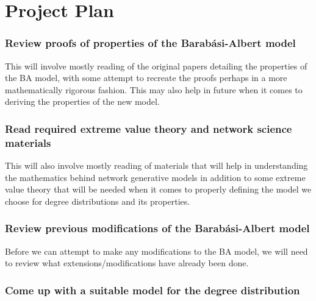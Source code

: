 \documentclass[
]{article}
\begin{document}
\newpage{}

\section{Project Plan}\label{project-plan}

\subsubsection*{Review proofs of properties of the Barabási-Albert
model}\label{review-proofs-of-properties-of-the-barabuxe1si-albert-model}

This will involve mostly reading of the original papers detailing the
properties of the BA model, with some attempt to recreate the proofs
perhaps in a more mathematically rigorous fashion. This may also help in
future when it comes to deriving the properties of the new model.

\subsubsection*{Read required extreme value theory and network science
materials}\label{read-required-extreme-value-theory-and-network-science-materials}

This will also involve mostly reading of materials that will help in
understanding the mathematics behind network generative models in
addition to some extreme value theory that will be needed when it comes
to properly defining the model we choose for degree distributions and
its properties.

\subsubsection*{Review previous modifications of the Barabási-Albert
model}\label{review-previous-modifications-of-the-barabuxe1si-albert-model}

Before we can attempt to make any modifications to the BA model, we will
need to review what extensions/modifications have already been done.

\subsubsection*{Come up with a suitable model for the degree
distribution}\label{come-up-with-a-suitable-model-for-the-degree-distribution}
\end{document}
